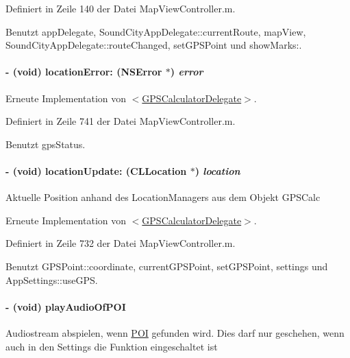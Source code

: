 Definiert in Zeile 140 der Datei MapViewController.m.

Benutzt appDelegate, SoundCityAppDelegate::currentRoute, mapView, SoundCityAppDelegate::routeChanged, setGPSPoint und showMarks:.\hypertarget{interface_map_view_controller_a76ee053461c5c2b8e7f1eb1a28e8d65b}{
\paragraph[{locationError:}]{\setlength{\rightskip}{0pt plus 5cm}-\/ (void) locationError: (NSError $\ast$) {\em error}}\hfill}
\label{interface_map_view_controller_a76ee053461c5c2b8e7f1eb1a28e8d65b}


Erneute Implementation von \hyperlink{protocol_g_p_s_calculator_delegate-p_a890f58f3468025f475f8bb7d9aa33332}{$<$GPSCalculatorDelegate$>$}.

Definiert in Zeile 741 der Datei MapViewController.m.

Benutzt gpsStatus.\hypertarget{interface_map_view_controller_ad3cf36d9e97a1a448f3cedb9a6d74d52}{
\paragraph[{locationUpdate:}]{\setlength{\rightskip}{0pt plus 5cm}-\/ (void) locationUpdate: (CLLocation $\ast$) {\em location}}\hfill}
\label{interface_map_view_controller_ad3cf36d9e97a1a448f3cedb9a6d74d52}
Aktuelle Position anhand des LocationManagers aus dem Objekt GPSCalc 

Erneute Implementation von \hyperlink{protocol_g_p_s_calculator_delegate-p_a0adb149b836a8e03a11ea255a5f01a31}{$<$GPSCalculatorDelegate$>$}.

Definiert in Zeile 732 der Datei MapViewController.m.

Benutzt GPSPoint::coordinate, currentGPSPoint, setGPSPoint, settings und AppSettings::useGPS.\hypertarget{interface_map_view_controller_a9210c6dd6212d6c463f1ab56ca84b8b7}{
\paragraph[{playAudioOfPOI}]{\setlength{\rightskip}{0pt plus 5cm}-\/ (void) playAudioOfPOI }\hfill}
\label{interface_map_view_controller_a9210c6dd6212d6c463f1ab56ca84b8b7}
Audiostream abspielen, wenn \hyperlink{interface_p_o_i}{POI} gefunden wird. Dies darf nur geschehen, wenn auch in den Settings die Funktion eingeschaltet ist 

